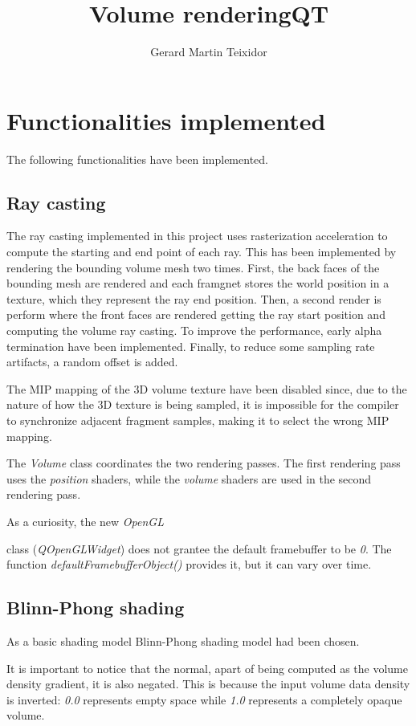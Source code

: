 \documentclass{article}
\title{Volume rendering}
\author{Gerard Martin Teixidor}
\begin{document}
\maketitle

\section*{Functionalities implemented}
The following functionalities have been implemented.

\subsection*{Ray casting}
The ray casting implemented in this project uses rasterization acceleration to compute the starting and end point of each ray. This has been implemented by rendering the bounding volume mesh two times. First, the back faces of the bounding mesh are rendered and each framgnet stores the world position in a texture, which they represent the ray end position. Then, a second render is perform where the front faces are rendered getting the ray start position and computing the volume ray casting. To improve the performance, early alpha termination have been implemented.
Finally, to reduce some sampling rate artifacts, a random offset is added.

The MIP mapping of the 3D volume texture have been disabled since, due to the nature of how the 3D texture is being sampled, it is impossible for the compiler to synchronize adjacent fragment samples, making it to select the wrong MIP mapping.

The \textit{Volume} class coordinates the two rendering passes. The first rendering pass uses the  \textit{position} shaders, while the \textit{volume} shaders are used in the second rendering pass.

As a curiosity, the new \textit{OpenGL }\title{QT} class (\textit{QOpenGLWidget}) does not grantee the default framebuffer to be \textit{0}. The function \textit{defaultFramebufferObject()} provides it, but it can vary over time.


\subsection*{Blinn-Phong shading}
As a basic shading model Blinn-Phong shading model had been chosen.

It is important to notice that the normal, apart of being computed as the volume density gradient, it is also negated. This is because the input volume data density is inverted: \textit{0.0} represents empty space while \textit{1.0} represents a completely opaque volume.
\end{document}
